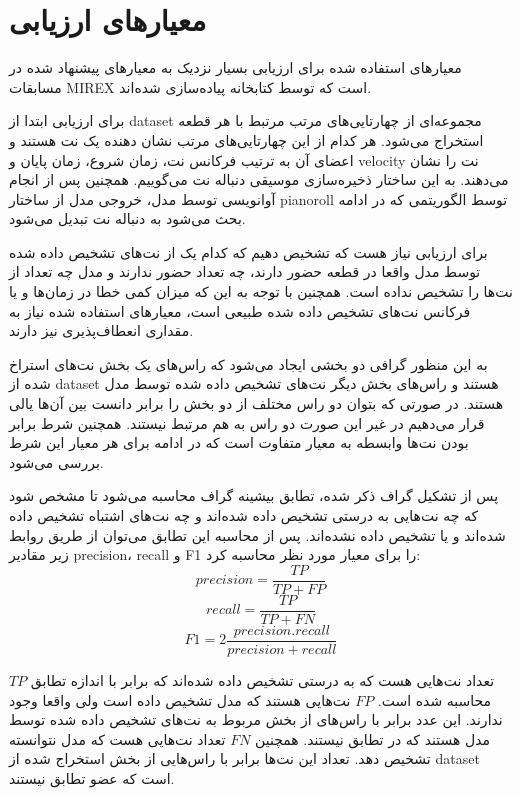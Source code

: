 \section{معیارهای ارزیابی}
معیارهای استفاده شده برای ارزیابی بسیار نزدیک به معیارهای پیشنهاد شده در مسابقات
MIREX است که توسط کتابخانه  \cite{raffel2014mir_eval} پیاده‌سازی
شده‌اند.

برای ارزیابی ابتدا از \gls{dataset} مجموعه‌ای از چهارتایی‌های مرتب مرتبط با هر
قطعه استخراج می‌شود. هر کدام از این چهارتایی‌های مرتب نشان دهنده یک نت هستند و
اعضای آن به ترتیب فرکانس نت، زمان شروع، زمان پایان و \gls{velocity} نت را نشان
می‌دهند. به این ساختار ذخیره‌سازی موسیقی دنباله نت می‌گوییم. همچنین پس از انجام
آوانویسی توسط مدل، خروجی مدل از ساختار \gls{pianoroll} توسط الگوریتمی که در
ادامه بحث می‌شود به دنباله نت تبدیل می‌شود.

برای ارزیابی نیاز هست که تشخیص دهیم که کدام یک از نت‌های تشخیص داده شده توسط مدل
واقعا در قطعه حضور دارند، چه تعداد حضور ندارند و مدل چه تعداد از نت‌ها را تشخیص
نداده است. همچنین با توجه به این که میزان کمی خطا در زمان‌ها و یا فرکانس نت‌های
تشخیص داده شده طبیعی است، معیارهای استفاده شده نیاز به مقداری انعطاف‌پذیری نیز
دارند.

به این منظور گرافی دو بخشی ایجاد می‌شود که راس‌های یک بخش نت‌های استراخ شده از
\gls{dataset} هستند و راس‌های بخش دیگر نت‌های تشخیص داده شده توسط مدل هستند. در
صورتی که بتوان دو راس مختلف از دو بخش را برابر دانست بین‌ آن‌ها یالی قرار
می‌دهیم در غیر این صورت دو راس به هم مرتبط نیستند. همچنین شرط برابر بودن نت‌ها
وابسطه به معیار متفاوت است که در ادامه برای هر معیار این شرط بررسی می‌شود.

پس از تشکیل گراف ذکر شده، تطابق بیشینه گراف محاسبه می‌شود تا مشخص شود که چه
نت‌هایی به درستی تشخیص داده شده‌اند و چه نت‌های اشتباه تشخیص داده شده‌اند و یا
تشخیص داده نشده‌اند. پس از محاسبه این تطابق می‌توان از طریق روابط زیر مقادیر
\gls{precision}، \gls{recall} و F1 را برای معیار مورد نظر محاسبه کرد:
\begin{equation}
    precision = \frac{TP}{TP + FP}
\end{equation}
\begin{equation}
    recall = \frac{TP}{TP + FN}
\end{equation}
\begin{equation}
    F1 = 2 \frac{precision . recall}{precision + recall}
\end{equation}

$TP$ تعداد نت‌هایی هست که به درستی تشخیص داده شده‌اند که برابر با اندازه تطابق
محاسبه شده است. $FP$ نت‌هایی هستند که مدل تشخیص داده است ولی واقعا وجود ندارند.
این عدد برابر با راس‌های از بخش مربوط به نت‌های تشخیص داده شده توسط مدل هستند که
در تطابق نیستند. همچنین $FN$ تعداد نت‌هایی هست که مدل نتوانسته تشخیص دهد. تعداد
این نت‌ها برابر با راس‌هایی از بخش استخراج شده از \gls{dataset} است که عضو تطابق
نیستند.

